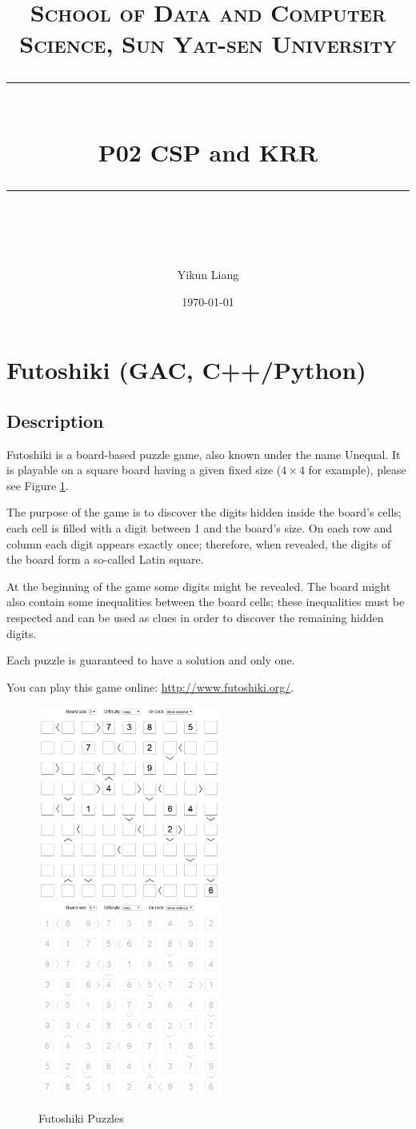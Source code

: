 ﻿\documentclass[a4paper, 11pt]{article}
\title{	
\normalfont \normalsize
\textsc{School of Data and Computer Science, Sun Yat-sen University} \\ [25pt] %
\rule{\textwidth}{0.5pt} \\[0.4cm] %
\huge  P02  CSP and KRR\\ %
\rule{\textwidth}{2pt} \\[0.5cm] %
\author{Yikun Liang}
\date{\normalsize\today}
}
\begin{document}
\maketitle
\tableofcontents
\newpage




\section{Futoshiki (GAC, C++/Python)}
\subsection{Description}
Futoshiki is a board-based puzzle game, also known under the name Unequal. It is playable on a square board having a given fixed size ($4\times4$ for example), please see Figure \ref{fig:futoshiki}.

The purpose of the game is to discover the digits hidden inside the board's cells; each cell is filled with a digit between 1 and the board's size. On each row and column each digit appears exactly once; therefore, when revealed, the digits of the board form a so-called Latin square.

At the beginning of the game some digits might be revealed. The board might also contain some inequalities between the board cells; these inequalities must be respected and can be used as clues in order to discover the remaining hidden digits.

Each puzzle is guaranteed to have a solution and only one.

You can play this game online: \url{http://www.futoshiki.org/}.
\begin{figure}[h]
  \centering
  \includegraphics[width=6cm]{Pic/futoshiki1}
  \qquad
  \includegraphics[width=6cm]{Pic/futoshiki2}
  \caption{Futoshiki Puzzles}
  \label{fig:futoshiki}
\end{figure}
\end{document}
